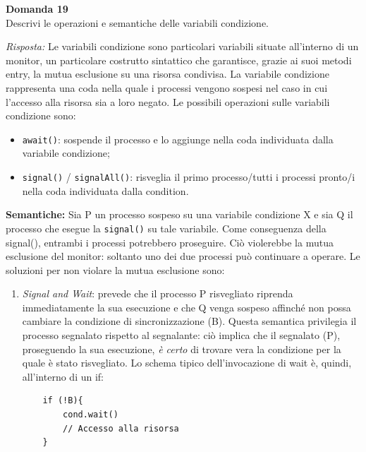 \documentclass{article}
\newenvironment{problem}[2][Domanda]
    { \begin{mdframed}[backgroundcolor=gray!20] \textbf{#1 #2} \\}
    {  \end{mdframed}}
\newenvironment{solution}
    {\textit{Risposta:}}
    {}
\begin{document}
\begin{problem}{19}
Descrivi le operazioni e semantiche delle variabili condizione.
\end{problem}
\begin{solution}
Le variabili condizione sono particolari variabili situate all’interno di un monitor, un particolare costrutto sintattico che garantisce, grazie ai suoi metodi entry, la mutua esclusione su una risorsa condivisa.
\newline
La variabile condizione rappresenta una coda nella quale i processi vengono sospesi nel caso in cui l’accesso alla risorsa sia a loro negato.
\newline
\newline
Le possibili operazioni sulle variabili condizione sono: 
\begin{itemize}
    \item \texttt{await()}: sospende il processo e lo aggiunge nella coda individuata dalla variabile condizione;
    \item \texttt{signal()} / \texttt{signalAll()}: risveglia il primo processo/tutti i processi pronto/i nella coda individuata dalla condition.
\end{itemize}
\textbf{Semantiche:} 
\newline
Sia P un processo sospeso su una variabile condizione X e sia Q il processo che esegue la \texttt{signal()} su tale variabile. Come conseguenza della signal(), entrambi i processi potrebbero proseguire.
\newline
Ciò violerebbe la mutua esclusione del monitor: soltanto uno dei due processi può continuare a operare.
Le soluzioni per non violare la mutua esclusione sono:
\begin{enumerate}
    \item \emph{Signal and Wait}: prevede che il processo P risvegliato riprenda immediatamente la sua esecuzione e che Q venga sospeso affinché non possa cambiare la condizione di sincronizzazione (B). Questa semantica privilegia il processo segnalato rispetto al segnalante: ciò implica che il segnalato (P), proseguendo la sua esecuzione, \textit{è certo} di trovare vera la condizione per la quale è stato risvegliato.
    \newline
    \newline
    Lo schema tipico dell’invocazione di wait è, quindi, all’interno di un if:
    \begin{verbatim}
    if (!B){
        cond.wait()
        // Accesso alla risorsa
    }
    \end{verbatim}

\end{enumerate}
\end{solution}
\end{document}
